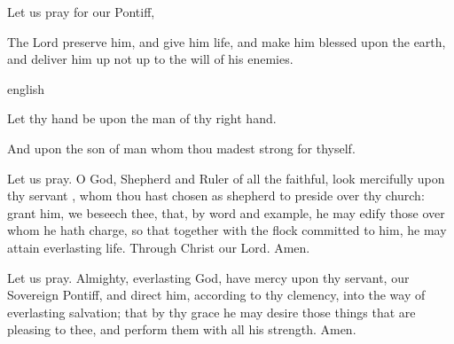 \begin{enpars} \noindent \vv Let us pray for our Pontiff, \nomen{}

\noindent
\rr The Lord preserve him, and give him life, and make him blessed upon the earth, and deliver him up not up to the will of his enemies.\end{enpars}

{english}
{\noindent \vv Let thy hand be upon the man of thy right hand.

\noindent \rr And upon the son of man whom thou madest strong for thyself.

\noindent Let us pray. O God, Shepherd and Ruler of all the faithful, look mercifully upon thy servant \nomen, whom thou hast chosen as shepherd to preside over thy church: grant him, we beseech thee, that, by word and example, he may edify those over whom he hath charge, so that together with the flock committed to him, he may attain everlasting life. Through Christ our Lord. Amen.

\orrubrique

\noindent Let us pray.  Almighty, everlasting God, have mercy upon thy servant, \nomen{} our Sovereign Pontiff, and direct him, according to thy clemency, into the way of everlasting salvation; that by thy grace he may desire those things that are pleasing to thee, and perform them with all his strength. Amen.}